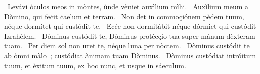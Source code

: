 ~Levávi òculos meos in mòntes, ùnde vèniet auxìlium mìhi. 
~Auxìlium meum a Dòmino, qui feċit ċaelum et terram. 
~Non det in commoçiónem pèdem tuum, néque dormítet qui custódit te. 
~Ecċe non dormitábit néque dórmiet qui custódit Izrahélem. 
~Dòminus custódit te, Dòminus protécçio tua super mànum dèxteram tuam. 
~Per diem sol non uret te, néque luna per nòctem. 
~Dòminus custódit te ab òmni màlo~; custódiat ànimam tuam Dòminus. 
~Dòminus custódiat intróitum tuum, et èxitum tuum, ex hoc nunc, et usque in sáeculum. 
